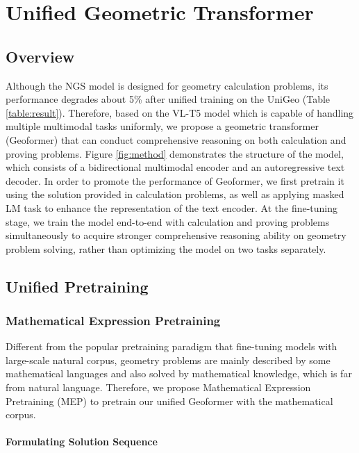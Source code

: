 \documentclass[11pt]{article}
\begin{document}
\section{Unified Geometric Transformer}

\subsection{Overview}

Although the NGS model \cite{chen2021geoqa} is designed for geometry calculation problems, its performance degrades about 5\% after unified training on the UniGeo (Table \ref{table:result}).
Therefore, based on the VL-T5 \cite{cho2021unifying} model which is capable of handling multiple multimodal tasks uniformly, we propose a geometric transformer (Geoformer) that can conduct comprehensive reasoning on both calculation and proving problems.
Figure \ref{fig:method} demonstrates the structure of the model, which consists of a bidirectional multimodal encoder and an autoregressive text decoder.
In order to promote the performance of Geoformer, we first pretrain it using the solution provided in calculation problems, as well as applying masked LM task to enhance the representation of the text encoder.
At the fine-tuning stage, we train the model end-to-end with calculation and proving problems simultaneously to acquire stronger comprehensive reasoning ability on geometry problem solving, rather than optimizing the model on two tasks separately.

\subsection{Unified Pretraining}

\subsubsection{Mathematical Expression Pretraining}

Different from the popular pretraining paradigm that fine-tuning models with large-scale natural corpus, geometry problems are mainly described by some mathematical languages and also solved by mathematical knowledge, which is far from natural language.
Therefore, we propose Mathematical Expression Pretraining (MEP) to pretrain our unified Geoformer with the mathematical corpus.


\paragraph{Formulating Solution Sequence}
\end{document}
